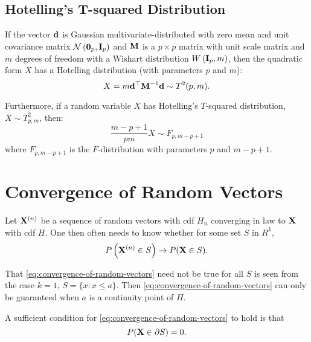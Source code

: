 \subsection{Hotelling's T-squared Distribution}

\begin{definition}
	If the vector ${\bf d}$ is Gaussian multivariate-distributed with zero mean and unit covariance matrix ${\mathcal N}\left(\mathbf{0}_p,{\bf I}_{p}\right)$ and ${\bf M}$ is a $p\times p$ matrix with unit scale matrix and $m$ degrees of freedom with a Wishart distribution $W\left({\bf I}_{p},m\right)$, then the quadratic form $X$ has a Hotelling distribution (with parameters $p$ and $m$):
	\begin{equation*}
		X=m{\bf d}^{\top}{\bf M}^{-1}{\bf d}\sim T^2(p,m).
	\end{equation*}

	Furthermore, if a random variable $X$ has Hotelling's $T$-squared distribution, $X \sim T_{p,m}^2$, then:
	\begin{equation*}
		\frac{m-p+1}{pm}X\sim F_{p,m-p+1}
	\end{equation*}
	where $F_{p,m-p+1}$ is the $F$-distribution with parameters $p$ and $m-p+1$.
\end{definition}

\section{Convergence of Random Vectors}

Let ${\bf X}^{(n)}$ be a sequence of random vectors with cdf $H_n$ converging in law to ${\bf X}$ with cdf $H$. One then often needs to know whether for some set $S$ in $R^k$,
\begin{equation}
	\label{eq:convergence-of-random-vectors}
	P\left({\bf X}^{(n)} \in S\right) \rightarrow P({\bf X} \in S).
\end{equation}

That \eqref{eq:convergence-of-random-vectors} need not be true for all $S$ is seen from the case $k=1$, $S=\{x:x\leq a\}$. Then \eqref{eq:convergence-of-random-vectors} can only be guaranteed when $a$ is a continuity point of $H$.
\begin{theorem}
	\label{thm:sufficient-condition-for-convergence-of-random-vectors}
	A sufficient condition for \eqref{eq:convergence-of-random-vectors} to hold is that
	\begin{equation*}
		P({\bf X}\in\partial S)=0.
	\end{equation*}
\end{theorem}

